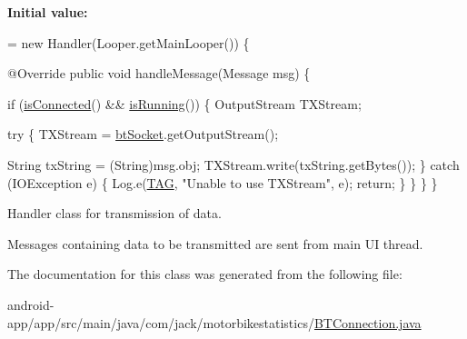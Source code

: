 {\bfseries Initial value\+:}
\begin{DoxyCode}
= \textcolor{keyword}{new} Handler(Looper.getMainLooper()) \{

        
        @Override
        \textcolor{keyword}{public} \textcolor{keywordtype}{void} handleMessage(Message msg) \{

            
            \textcolor{keywordflow}{if} (\hyperlink{class_android_app_1_1_b_t_connection_a1c91fcddfe9f3b69cd0141742103191a}{isConnected}() && \hyperlink{class_android_app_1_1_b_t_connection_a88abb39350aef278f15e54be4d0d1df3}{isRunning}()) \{
                OutputStream TXStream;

                
                \textcolor{keywordflow}{try} \{
                    TXStream = \hyperlink{class_android_app_1_1_b_t_connection_af3cdc6c880b28361d87d0118ace0e49c}{btSocket}.getOutputStream();

                    String txString = (String)msg.obj;
                    TXStream.write(txString.getBytes());
                \} \textcolor{keywordflow}{catch} (IOException e) \{
                    Log.e(\hyperlink{class_android_app_1_1_b_t_connection_ad838024d59c68be866b5db329d6f6230}{TAG}, \textcolor{stringliteral}{"Unable to use TXStream"}, e);
                    \textcolor{keywordflow}{return};
                \}
            \}
        \}
    \}
\end{DoxyCode}


Handler class for transmission of data. 

Messages containing data to be transmitted are sent from main UI thread. 

The documentation for this class was generated from the following file\+:\begin{DoxyCompactItemize}
\item 
android-\/app/app/src/main/java/com/jack/motorbikestatistics/\hyperlink{_b_t_connection_8java}{B\+T\+Connection.\+java}\end{DoxyCompactItemize}
